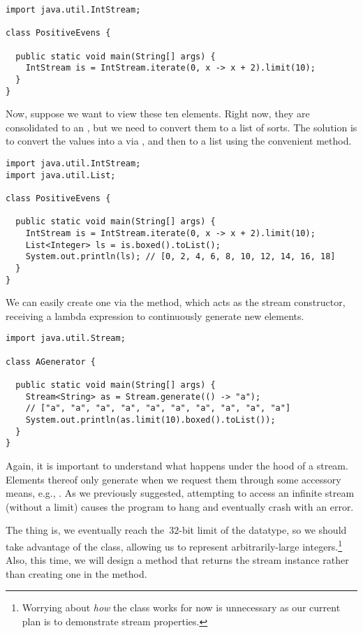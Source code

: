 \begin{lstlisting}[language=MyJava]
import java.util.IntStream;

class PositiveEvens {
  
  public static void main(String[] args) {
    IntStream is = IntStream.iterate(0, x -> x + 2).limit(10);
  }
}
\end{lstlisting}

Now, suppose we want to view these ten elements. 
Right now, they are consolidated to an , but we need to convert them to a list of sorts. 
The solution is to convert the values into a  via , and then to a list using the convenient  method.

\begin{lstlisting}[language=MyJava]
import java.util.IntStream;
import java.util.List;

class PositiveEvens {
  
  public static void main(String[] args) {
    IntStream is = IntStream.iterate(0, x -> x + 2).limit(10);
    List<Integer> ls = is.boxed().toList();
    System.out.println(ls); // [0, 2, 4, 6, 8, 10, 12, 14, 16, 18]
  }
}
\end{lstlisting}

We can easily create one via the  method, which acts as the stream constructor, receiving a lambda expression to continuously generate new elements.

\begin{lstlisting}[language=MyJava]
import java.util.Stream;

class AGenerator {

  public static void main(String[] args) {
    Stream<String> as = Stream.generate(() -> "a");
    // ["a", "a", "a", "a", "a", "a", "a", "a", "a", "a"]
    System.out.println(as.limit(10).boxed().toList()); 
  } 
}
\end{lstlisting}

Again, it is important to understand what happens under the hood of a stream. 
Elements thereof only generate when we request them through some accessory means, e.g., . 
As we previously suggested, attempting to access an infinite stream (without a limit) causes the program to hang and eventually crash with an  error.

The thing is, we eventually reach the~$32$-bit limit of the  datatype, so we should take advantage of the  class, allowing us to represent arbitrarily-large integers.\footnote{Worrying about \emph{how} the  class works for now is unnecessary as our current plan is to demonstrate stream properties.} 
Also, this time, we will design a method that returns the stream instance rather than creating one in the  method.

